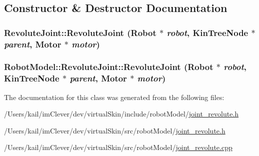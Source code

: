 \subsection{Constructor \& Destructor Documentation}
\hypertarget{class_robot_model_1_1_revolute_joint_afa148418b3aeabb6294dcb8bdc033208}{
\subsubsection[{RevoluteJoint}]{\setlength{\rightskip}{0pt plus 5cm}RevoluteJoint::RevoluteJoint ({\bf Robot} $\ast$ {\em robot}, \/  {\bf KinTreeNode} $\ast$ {\em parent}, \/  {\bf Motor} $\ast$ {\em motor})}}
\label{class_robot_model_1_1_revolute_joint_afa148418b3aeabb6294dcb8bdc033208}
\hypertarget{class_robot_model_1_1_revolute_joint_aecc7fa3eae25c360a903ff89e196b576}{
\subsubsection[{RevoluteJoint}]{\setlength{\rightskip}{0pt plus 5cm}RobotModel::RevoluteJoint::RevoluteJoint ({\bf Robot} $\ast$ {\em robot}, \/  {\bf KinTreeNode} $\ast$ {\em parent}, \/  {\bf Motor} $\ast$ {\em motor})}}
\label{class_robot_model_1_1_revolute_joint_aecc7fa3eae25c360a903ff89e196b576}


The documentation for this class was generated from the following files:\begin{DoxyCompactItemize}
\item 
/Users/kail/imClever/dev/virtualSkin/include/robotModel/\hyperlink{include_2robot_model_2joint__revolute_8h}{joint\_\-revolute.h}\item 
/Users/kail/imClever/dev/virtualSkin/src/robotModel/\hyperlink{src_2robot_model_2joint__revolute_8h}{joint\_\-revolute.h}\item 
/Users/kail/imClever/dev/virtualSkin/src/robotModel/\hyperlink{joint__revolute_8cpp}{joint\_\-revolute.cpp}\end{DoxyCompactItemize}
